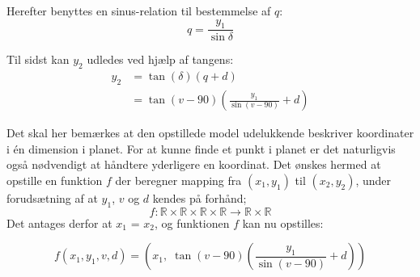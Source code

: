 Herefter benyttes en sinus-relation til bestemmelse af $q$:
$$q = \frac{y_1}{\sin{\delta}}$$

Til sidst kan $y_2$ udledes ved hjælp af tangens:
\begin{align*}
y_2 &= \tan(\delta)(q+d)\\
&= \tan(v-90)\left(\frac{y_1}{\sin(v-90)} + d\right)
\end{align*}

Det skal her bemærkes at den opstillede model udelukkende beskriver koordinater i \'en dimension i planet.
For at kunne finde et punkt i planet er det naturligvis også nødvendigt at håndtere yderligere en koordinat.
Det ønskes hermed at opstille en funktion $f$ der beregner mapping fra $(x_1,y_1)$ til $(x_2,y_2)$, under forudsætning af at $y_1$, $v$ og $d$ kendes på forhånd;
$$f: \mathbb{R} \times \mathbb{R} \times \mathbb{R} \times \mathbb{R} \rightarrow \mathbb{R} \times \mathbb{R}$$
Det antages derfor at $x_1$ = $x_2$, og funktionen $f$ kan nu opstilles:

$$f(x_1,y_1,v,d)=\left(x_1,\;\tan(v-90)\left(\frac{y_1}{\sin(v-90)} + d\right)\right)$$